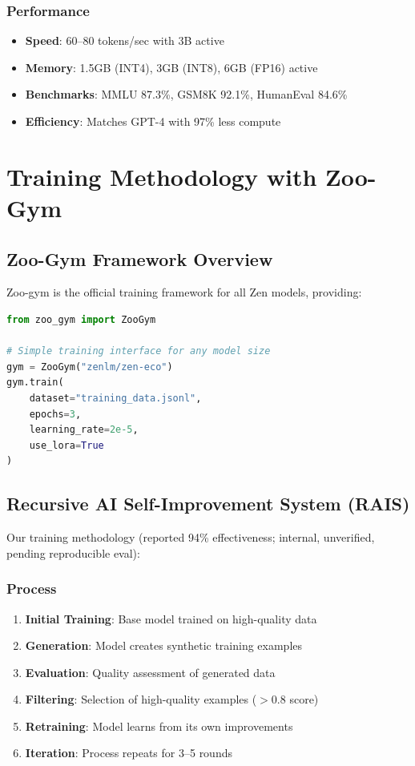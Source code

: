 \documentclass[11pt,a4paper]{article}
\begin{document}
\subsubsection{Performance}
\begin{itemize}
    \item \textbf{Speed}: 60--80 tokens/sec with 3B active
    \item \textbf{Memory}: 1.5GB (INT4), 3GB (INT8), 6GB (FP16) active
    \item \textbf{Benchmarks}: MMLU 87.3\%, GSM8K 92.1\%, HumanEval 84.6\%
    \item \textbf{Efficiency}: Matches GPT-4 with 97\% less compute
\end{itemize}

\section{Training Methodology with Zoo-Gym}

\subsection{Zoo-Gym Framework Overview}

Zoo-gym is the official training framework for all Zen models, providing:

\begin{lstlisting}[language=Python]
from zoo_gym import ZooGym

# Simple training interface for any model size
gym = ZooGym("zenlm/zen-eco")
gym.train(
    dataset="training_data.jsonl",
    epochs=3,
    learning_rate=2e-5,
    use_lora=True
)
\end{lstlisting}

\subsection{Recursive AI Self-Improvement System (RAIS)}

Our training methodology (reported 94\% effectiveness; internal, unverified, pending reproducible eval):

\subsubsection{Process}
\begin{enumerate}
    \item \textbf{Initial Training}: Base model trained on high-quality data
    \item \textbf{Generation}: Model creates synthetic training examples
    \item \textbf{Evaluation}: Quality assessment of generated data
    \item \textbf{Filtering}: Selection of high-quality examples ($>0.8$ score)
    \item \textbf{Retraining}: Model learns from its own improvements
    \item \textbf{Iteration}: Process repeats for 3--5 rounds
\end{enumerate}
\end{document}
